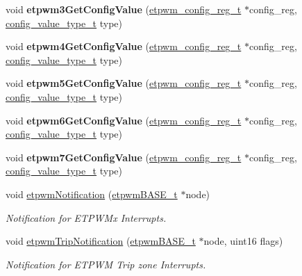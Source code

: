 \begin{DoxyCompactItemize}
\mbox{\label{group__ePWM_ga6b165c0595fcfab78231f740be53bc5b}} 
void {\bfseries etpwm3\+Get\+Config\+Value} (\mbox{\hyperlink{structetpwm__config__reg}{etpwm\+\_\+config\+\_\+reg\+\_\+t}} $\ast$config\+\_\+reg, \mbox{\hyperlink{sys__common_8h_a9daf9a5992391b058477d28d107ee5e2}{config\+\_\+value\+\_\+type\+\_\+t}} type)
\item 
\mbox{\label{group__ePWM_ga57065ed5781393165dda23ef870e8ae5}} 
void {\bfseries etpwm4\+Get\+Config\+Value} (\mbox{\hyperlink{structetpwm__config__reg}{etpwm\+\_\+config\+\_\+reg\+\_\+t}} $\ast$config\+\_\+reg, \mbox{\hyperlink{sys__common_8h_a9daf9a5992391b058477d28d107ee5e2}{config\+\_\+value\+\_\+type\+\_\+t}} type)
\item 
\mbox{\label{group__ePWM_ga9a1ee59df37d70734bb887b99d7da9a0}} 
void {\bfseries etpwm5\+Get\+Config\+Value} (\mbox{\hyperlink{structetpwm__config__reg}{etpwm\+\_\+config\+\_\+reg\+\_\+t}} $\ast$config\+\_\+reg, \mbox{\hyperlink{sys__common_8h_a9daf9a5992391b058477d28d107ee5e2}{config\+\_\+value\+\_\+type\+\_\+t}} type)
\item 
\mbox{\label{group__ePWM_gaf3aefe0dc4eab9cee926c476b1bd78a2}} 
void {\bfseries etpwm6\+Get\+Config\+Value} (\mbox{\hyperlink{structetpwm__config__reg}{etpwm\+\_\+config\+\_\+reg\+\_\+t}} $\ast$config\+\_\+reg, \mbox{\hyperlink{sys__common_8h_a9daf9a5992391b058477d28d107ee5e2}{config\+\_\+value\+\_\+type\+\_\+t}} type)
\item 
\mbox{\label{group__ePWM_ga64bc55b7f27c79d52de907646a1c8cf8}} 
void {\bfseries etpwm7\+Get\+Config\+Value} (\mbox{\hyperlink{structetpwm__config__reg}{etpwm\+\_\+config\+\_\+reg\+\_\+t}} $\ast$config\+\_\+reg, \mbox{\hyperlink{sys__common_8h_a9daf9a5992391b058477d28d107ee5e2}{config\+\_\+value\+\_\+type\+\_\+t}} type)
\item 
void \mbox{\hyperlink{group__ePWM_gafaa5c117b76b6b08df02364245b78daf}{etpwm\+Notification}} (\mbox{\hyperlink{reg__etpwm_8h_a3030c3a8f18ffd60ee3de5bbd7632891}{etpwm\+B\+A\+S\+E\+\_\+t}} $\ast$node)
\begin{DoxyCompactList}\small\item\em Notification for E\+T\+P\+W\+Mx Interrupts. \end{DoxyCompactList}\item 
void \mbox{\hyperlink{group__ePWM_ga9ef5c284f9f7b5d948f438a6a4288fc6}{etpwm\+Trip\+Notification}} (\mbox{\hyperlink{reg__etpwm_8h_a3030c3a8f18ffd60ee3de5bbd7632891}{etpwm\+B\+A\+S\+E\+\_\+t}} $\ast$node, uint16 flags)
\begin{DoxyCompactList}\small\item\em Notification for E\+T\+P\+WM Trip zone Interrupts. \end{DoxyCompactList}\end{DoxyCompactItemize}


